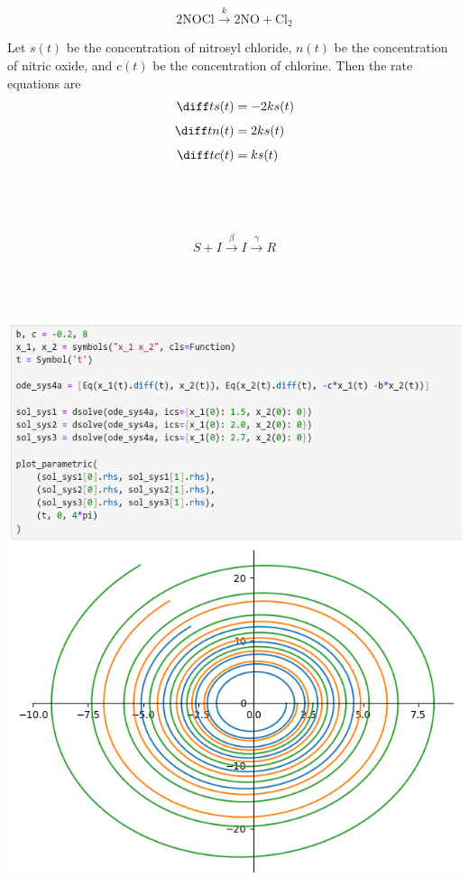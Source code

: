 \documentclass[a4paper]{article}
\begin{document}
\subsection{~}

$$2\text{NOCl} \xrightarrow{\ k\ } 2\text{NO} + \text{Cl}_2$$

Let $s(t)$ be the concentration of nitrosyl chloride, $n(t)$ be the concentration of nitric oxide, and $c(t)$ be the concentration of chlorine. Then the rate equations are \begin{align*}
	\diff t s(t) &= -2ks(t)\\[1ex]
	\diff t n(t) &= 2ks(t)\\[1ex]
	\diff t c(t) &= ks(t)
\end{align*}

\subsection{~}

$$S + I \xrightarrow{\ \beta\ } I \xrightarrow{\ \gamma\ } R$$


\subsection{~}

\includegraphics[scale=0.55]{Q4}
\end{document}
